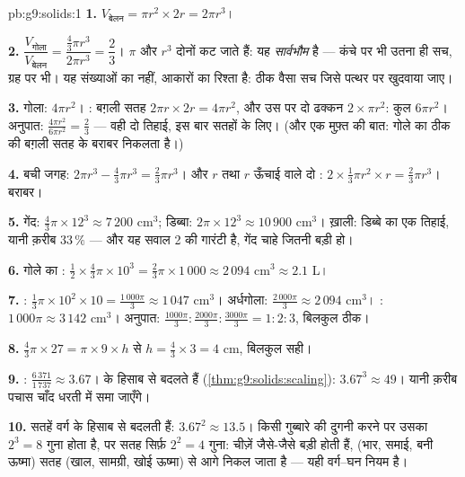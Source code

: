 \begin{solution}{pb:g9:solids:1}
\textbf{1.} $V_{\text{बेलन}} = \pi r^2 \times 2r = 2\pi r^3$।

\textbf{2.} $\dfrac{V_{\text{गोला}}}{V_{\text{बेलन}}}
= \dfrac{\frac43 \pi r^3}{2 \pi r^3} = \dfrac23$। $\pi$ और $r^3$
दोनों कट जाते हैं: यह  \emph{सार्वभौम} है --- कंचे पर भी
उतना ही सच, ग्रह पर भी। यह संख्याओं का नहीं, आकारों का रिश्ता है:
ठीक वैसा सच जिसे पत्थर पर खुदवाया जाए।

\textbf{3.} गोला: $4\pi r^2$। : बग़ली सतह
$2\pi r \times 2r = 4\pi r^2$, और उस पर दो ढक्कन
$2 \times \pi r^2$: कुल $6\pi r^2$। अनुपात:
$\frac{4\pi r^2}{6\pi r^2} = \frac23$ --- वही दो तिहाई, इस बार
सतहों के लिए। (और एक मुफ़्त की बात: गोले का  ठीक  की
बग़ली सतह के बराबर निकलता है।)

\textbf{4.} बची जगह: $2\pi r^3 - \frac43\pi r^3 =
\frac23 \pi r^3$। और $r$  तथा $r$ ऊँचाई वाले दो :
$2 \times \frac13 \pi r^2 \times r = \frac23 \pi r^3$। बराबर।

\textbf{5.} गेंद: $\frac43 \pi \times 12^3 \approx 7\,200$
cm$^3$; डिब्बा: $2\pi \times 12^3 \approx 10\,900$ cm$^3$। ख़ाली:
डिब्बे का एक तिहाई, यानी क़रीब $33\,\%$ --- और यह सवाल 2 की
गारंटी है, गेंद चाहे जितनी बड़ी हो।

\textbf{6.} गोले का :
$\frac12 \times \frac43 \pi \times 10^3 = \frac23 \pi \times
1\,000 \approx 2\,094$ cm$^3 \approx 2.1$ L।

\textbf{7.} : $\frac13 \pi \times 10^2 \times 10 =
\frac{1\,000\pi}{3} \approx 1\,047$ cm$^3$। अर्धगोला:
$\frac{2\,000\pi}{3} \approx 2\,094$ cm$^3$। :
$1\,000\pi \approx 3\,142$ cm$^3$। अनुपात:
$\frac{1000\pi}{3} : \frac{2000\pi}{3} : \frac{3000\pi}{3}
= 1 : 2 : 3$, बिलकुल ठीक।

\textbf{8.} $\frac43 \pi \times 27 = \pi \times 9 \times h$ से
$h = \frac43 \times 3 = 4$ cm, बिलकुल सही।

\textbf{9.} : $\frac{6\,371}{1\,737} \approx 3.67$।
  के हिसाब से बदलते हैं (\cref{thm:g9:solids:scaling}):
$3.67^3 \approx 49$। यानी क़रीब पचास चाँद धरती में समा जाएँगे।

\textbf{10.} सतहें वर्ग के हिसाब से बदलती हैं:
$3.67^2 \approx 13.5$। किसी गुब्बारे की  दुगनी करने पर उसका
 $2^3 = 8$ गुना होता है, पर सतह सिर्फ़ $2^2 = 4$ गुना: चीज़ें
जैसे-जैसे बड़ी होती हैं,  (भार, समाई, बनी ऊष्मा) सतह (खाल,
सामग्री, खोई ऊष्मा) से आगे निकल जाता है --- यही वर्ग--घन नियम है।


\end{solution}
